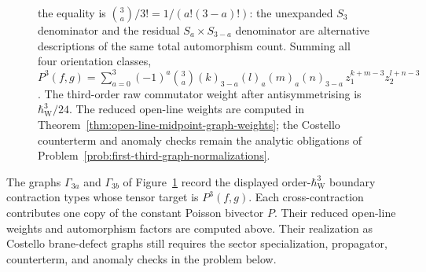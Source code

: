 \documentclass[11pt]{memoir}
\begin{document}
\begin{figure}[H]
{	    the equality is
	    \(\binom{3}{a}/3!=1/(a!(3-a)!)\): the unexpanded \(S_3\)
	    denominator and the residual \(S_a\times S_{3-a}\) denominator
	    are alternative descriptions of the same total automorphism
	    count. Summing all four orientation classes,
    \(P^3(f,g)=\sum_{a=0}^{3}(-1)^a\binom{3}{a}
    (k)_{3-a}(l)_a(m)_a(n)_{3-a}\,z_1^{k+m-3}z_2^{l+n-3}\).
    The third-order raw commutator weight after antisymmetrising is
    \(\hbar_{\mathrm{W}}^3/24\). The reduced open-line
    weights are computed in
	    Theorem~\ref{thm:open-line-midpoint-graph-weights}; the
    Costello counterterm and anomaly checks remain the analytic
    obligations of Problem~\ref{prob:first-third-graph-normalizations}.}
  \label{fig:gamma3}
\end{figure}
The graphs $\Gamma_{3a}$ and $\Gamma_{3b}$ of Figure~\ref{fig:gamma3} record the
displayed order-\(\hbar_{\mathrm{W}}^3\) boundary contraction types whose tensor target is
$P^3(f,g)$. Each cross-contraction contributes one copy of the constant Poisson
bivector $P$. Their reduced open-line weights and automorphism factors are
computed above. Their realization as Costello brane-defect graphs still
requires the sector specialization, propagator, counterterm, and anomaly
checks in the problem below.
\end{document}
